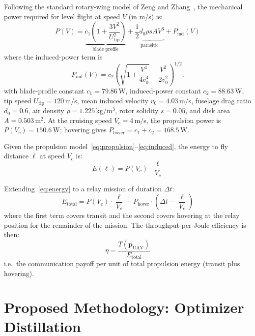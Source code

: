 \documentclass[journal]{IEEEtran}
\begin{document}
Following the standard rotary-wing model of Zeng and Zhang~\cite{zeng2017energy}, the mechanical power required for level flight at speed $V$ (in m/s) is:
\begin{equation}
    P(V) = \underbrace{c_1\!\left(1 + \frac{3V^2}{U_\text{tip}^2}\right)}_{\text{blade profile}} + \underbrace{\frac{1}{2}d_0 \rho s A V^3}_{\text{parasitic}} + P_\text{ind}(V)
    \label{eq:propulsion}
\end{equation}
where the induced-power term is
\begin{equation}
    P_\text{ind}(V) = c_2\!\left(\sqrt{1 + \frac{V^4}{4v_0^4}} - \frac{V^2}{2v_0^2}\right)^{\!1/2}.
    \label{eq:induced}
\end{equation}
with blade-profile constant $c_1 = 79.86$\,W, induced-power constant $c_2 = 88.63$\,W, tip speed $U_\text{tip} = 120$\,m/s, mean induced velocity $v_0 = 4.03$\,m/s, fuselage drag ratio $d_0 = 0.6$, air density $\rho = 1.225$\,kg/m$^3$, rotor solidity $s = 0.05$, and disk area $A = 0.503$\,m$^2$. At the cruising speed $V_c = 4$\,m/s, the propulsion power is $P(V_c) = 150.6$\,W; hovering gives $P_\text{hover} = c_1 + c_2 = 168.5$\,W.

Given the propulsion model~\eqref{eq:propulsion}--\eqref{eq:induced}, the energy to fly distance $\ell$ at speed $V_c$ is:
\begin{equation}
    E(\ell) = P(V_c) \cdot \frac{\ell}{V_c}
    \label{eq:energy}
\end{equation}

Extending~\eqref{eq:energy} to a relay mission of duration $\Delta t$:
\begin{equation}
    E_\text{total} = P(V_c) \cdot \frac{\ell}{V_c} + P_\text{hover} \cdot \left(\Delta t - \frac{\ell}{V_c}\right)
    \label{eq:energy_total}
\end{equation}
where the first term covers transit and the second covers hovering at the relay position for the remainder of the mission. The throughput-per-Joule efficiency is then:
\begin{equation}
    \eta = \frac{T(\mathbf{p}_\text{UAV})}{E_\text{total}}
    \label{eq:efficiency}
\end{equation}
i.e.\ the communication payoff per unit of total propulsion energy (transit plus hovering).


\section{Proposed Methodology: Optimizer Distillation}
\label{sec:method}
\end{document}
